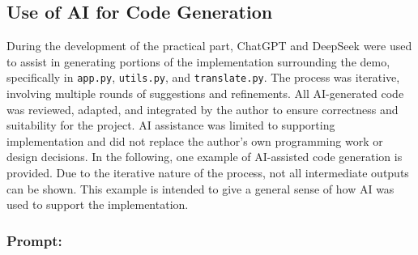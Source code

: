 \subsection{Use of AI for Code Generation}\label{appendix:ai_code}
During the development of the practical part, ChatGPT and DeepSeek were used to assist in generating portions of the implementation surrounding the demo, specifically in \texttt{app.py}, \texttt{utils.py}, and \texttt{translate.py}. The process was iterative, involving multiple rounds of suggestions and refinements. All AI-generated code was reviewed, adapted, and integrated by the author to ensure correctness and suitability for the project. AI assistance was limited to supporting implementation and did not replace the author’s own programming work or design decisions. In the following, one example of AI-assisted code generation is provided. Due to the iterative nature of the process, not all intermediate outputs can be shown. This example is intended to give a general sense of how AI was used to support the implementation.

\subsubsection{Prompt: } 

